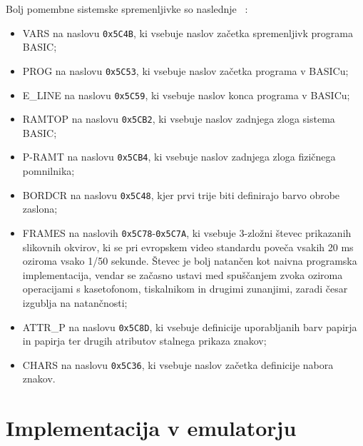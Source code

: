 \documentclass[a4paper, 12pt, openright]{book}
\begin{document}
    Bolj pomembne sistemske spremenljivke so naslednje ~\cite{strojnijezikzaprocesorz80,
    zxspectrumbasicprogramming}:
    \begin{itemize}
        \item VARS na naslovu \texttt{0x5C4B}, ki vsebuje naslov začetka spremenljivk
            programa BASIC;

        \item PROG na naslovu \texttt{0x5C53}, ki vsebuje naslov začetka programa
            v BASICu;

        \item E\_LINE na naslovu \texttt{0x5C59}, ki vsebuje naslov konca programa
            v BASICu;

        \item RAMTOP na naslovu \texttt{0x5CB2}, ki vsebuje naslov zadnjega zloga
            sistema BASIC;

        \item P-RAMT na naslovu \texttt{0x5CB4}, ki vsebuje naslov zadnjega zloga
            fizičnega pomnilnika;

        \item BORDCR na naslovu \texttt{0x5C48}, kjer prvi trije biti definirajo barvo
            obrobe zaslona;

        \item FRAMES na naslovih \texttt{0x5C78}-\texttt{0x5C7A}, ki vsebuje 3-zložni
            števec prikazanih slikovnih okvirov, ki se pri evropskem video standardu
            poveča vsakih 20 ms oziroma vsako 1/50 sekunde. Števec je bolj
            natančen kot naivna programska implementacija, vendar se začasno ustavi
            med spuščanjem zvoka oziroma operacijami s kasetofonom, tiskalnikom
            in drugimi zunanjimi, zaradi česar izgublja na natančnosti;

        \item ATTR\_P na naslovu \texttt{0x5C8D}, ki vsebuje definicije uporabljanih
            barv papirja in papirja ter drugih atributov stalnega prikaza znakov;

        \item CHARS na naslovu \texttt{0x5C36}, ki vsebuje naslov začetka definicije
            nabora znakov.
    \end{itemize}

    \section{Implementacija v emulatorju}
\end{document}
